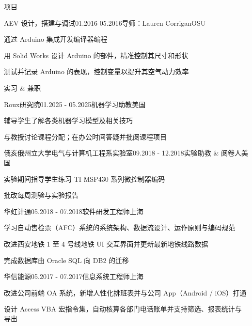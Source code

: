 \documentclass{resume} %
\begin{document}
\begin{rSection}{项目}
  \begin{rSubsection}{AEV 设计，搭建与调试}{01.2016-05.2016}{导师：Lauren Corrigan}{OSU}
    \item 通过 Arduino 集成开发编译器编程
    \item 用 Solid Works 设计 Arduino 的部件，精准控制其尺寸和形状
    \item 测试并记录 Arduino 的表现，控制变量以提升其空气动力效率
  \end{rSubsection}

\end{rSection}

\begin{rSection}{实习 \& 兼职}

  \begin{rSubsection}{Roux研究院}{01.2025 - 05.2025}{机器学习助教}{美国}
    \item 辅导学生了解各类机器学习模型及相关技巧
    \item 与教授讨论课程分配；在办公时间答疑并批阅课程项目
  \end{rSubsection}

  \begin{rSubsection}{俄亥俄州立大学电气与计算机工程系实验室}{09.2018 - 12.2018}{实验助教 \& 阅卷人}{美国}
    \item 实验期间指导学生练习 TI MSP430 系列微控制器编码
    \item 批改每周测验与实验报告
  \end{rSubsection}

  \begin{rSubsection}{华虹计通}{05.2018 - 07.2018}{软件研发工程师}{上海}
    \item 学习自动售检票（AFC）系统的系统架构、数据流设计、运作原则与编码规范
    \item 改进西安地铁 1 至 4 号线地铁 UI 交互界面并更新最新地铁线路数据
    \item 完成数据库由 Oracle SQL 向 DB2 的迁移
  \end{rSubsection}

  \begin{rSubsection}{华信能源}{05.2017 - 07.2017}{信息系统工程师}{上海}
    \item 改进公司前端 OA 系统，新增人性化排班表并与公司 App（Android / iOS）打通
    \item 设计 Access VBA 宏指令集，自动核算各部门电话账单并支持筛选、报表统计与导出
  \end{rSubsection}

\end{rSection}
\end{document}
